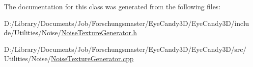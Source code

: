The documentation for this class was generated from the following files\+:\begin{DoxyCompactItemize}
\item 
D\+:/\+Library/\+Documents/\+Job/\+Forschungsmaster/\+Eye\+Candy3\+D/\+Eye\+Candy3\+D/include/\+Utilities/\+Noise/\mbox{\hyperlink{_noise_texture_generator_8h}{Noise\+Texture\+Generator.\+h}}\item 
D\+:/\+Library/\+Documents/\+Job/\+Forschungsmaster/\+Eye\+Candy3\+D/\+Eye\+Candy3\+D/src/\+Utilities/\+Noise/\mbox{\hyperlink{_noise_texture_generator_8cpp}{Noise\+Texture\+Generator.\+cpp}}\end{DoxyCompactItemize}

